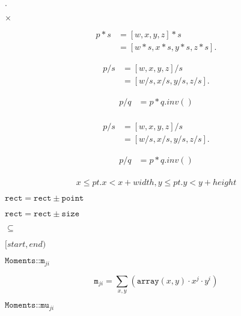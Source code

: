\documentclass{article}
\begin{document}
$\cdot$
\pagebreak

$\times $
\pagebreak

\[ \begin{equation} \begin{split} p * s &= [w, x, y, z] * s\\ &=[w * s, x * s, y * s, z * s]. \end{split} \end{equation} \]
\pagebreak

\[ \begin{equation} \begin{split} p / s &= [w, x, y, z] / s\\ &=[w/s, x/s, y/s, z/s]. \end{split} \end{equation} \]
\pagebreak

\[ \begin{equation} \begin{split} p / q &= p * q.inv()\\ \end{split} \end{equation} \]
\pagebreak

\[ \begin{equation} \begin{split} p / s &= [w, x, y, z] / s\\ &=[w / s, x / s, y / s, z / s]. \end{split} \end{equation} \]
\pagebreak

\[ \begin{equation} \begin{split} p / q&= p * q.inv()\\ \end{split} \end{equation} \]
\pagebreak

\[x \leq pt.x < x+width, y \leq pt.y < y+height\]
\pagebreak

$\texttt{rect} = \texttt{rect} \pm \texttt{point}$
\pagebreak

$\texttt{rect} = \texttt{rect} \pm \texttt{size}$
\pagebreak

$\subseteq$
\pagebreak

$[start,end)$
\pagebreak

$\texttt{Moments::m}_{ji}$
\pagebreak

\[\texttt{m} _{ji}= \sum _{x,y} \left ( \texttt{array} (x,y) \cdot x^j \cdot y^i \right )\]
\pagebreak

$\texttt{Moments::mu}_{ji}$
\pagebreak
\end{document}
